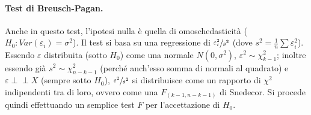 \documentclass[a4page, 11pt]{article} %
\def\indep{\perp \!\!\! \perp }
\begin{document}
\paragraph{Test di Breusch-Pagan.} Anche in questo test, l’ipotesi nulla è quella di omoschedasticità ($H_0: Var(\varepsilon_i) = \sigma^2$).
Il test si basa su una regressione di $\sfrac{\varepsilon^2_i}{s^2}$ (dove $s^2 = \frac{1}{n}\sum{\varepsilon_i^2}$).
Essendo  $\varepsilon$ distribuita (sotto $H_0$) come una normale $N(0, \sigma^2)$, $\varepsilon^2 \sim \chi^2_{k-1}$; inoltre essendo già $s^2 \sim \chi^2_{n-k-1}$ (perché anch'esso somma di normali al quadrato) e $\varepsilon \indep X$ (sempre sotto $H_0$), $\sfrac{\varepsilon^2}{s^2}$ si distribuisce come un rapporto di $\chi^2$ indipendenti tra di loro, ovvero come una $F_{(k-1, n-k-1)}$ di Snedecor.
Si procede quindi effettuando un semplice test $F$ per l'accettazione di $H_0$.
\end{document}
